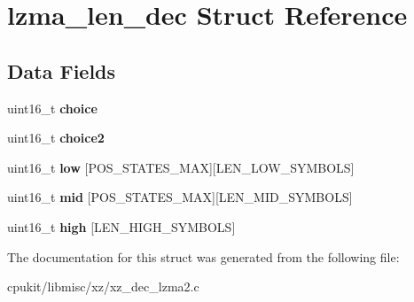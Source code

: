 \hypertarget{structlzma__len__dec}{}\section{lzma\+\_\+len\+\_\+dec Struct Reference}
\label{structlzma__len__dec}
\subsection*{Data Fields}
\begin{DoxyCompactItemize}
\item 
\mbox{\label{structlzma__len__dec_a783feccf1cfaf45ca997d0d4841f206d}} 
uint16\+\_\+t {\bfseries choice}
\item 
\mbox{\label{structlzma__len__dec_a550309c97d2255918fe450355934f0f1}} 
uint16\+\_\+t {\bfseries choice2}
\item 
\mbox{\label{structlzma__len__dec_a34574ecadfc03ed153d248dd2dd4d13c}} 
uint16\+\_\+t {\bfseries low} \mbox{[}P\+O\+S\+\_\+\+S\+T\+A\+T\+E\+S\+\_\+\+M\+AX\mbox{]}\mbox{[}L\+E\+N\+\_\+\+L\+O\+W\+\_\+\+S\+Y\+M\+B\+O\+LS\mbox{]}
\item 
\mbox{\label{structlzma__len__dec_aa83efc9cacdff64e0c13ddc56646b4e4}} 
uint16\+\_\+t {\bfseries mid} \mbox{[}P\+O\+S\+\_\+\+S\+T\+A\+T\+E\+S\+\_\+\+M\+AX\mbox{]}\mbox{[}L\+E\+N\+\_\+\+M\+I\+D\+\_\+\+S\+Y\+M\+B\+O\+LS\mbox{]}
\item 
\mbox{\label{structlzma__len__dec_af7e8d719ac1a9d7b350a6f661dbaf2b3}} 
uint16\+\_\+t {\bfseries high} \mbox{[}L\+E\+N\+\_\+\+H\+I\+G\+H\+\_\+\+S\+Y\+M\+B\+O\+LS\mbox{]}
\end{DoxyCompactItemize}


The documentation for this struct was generated from the following file\+:\begin{DoxyCompactItemize}
\item 
cpukit/libmisc/xz/xz\+\_\+dec\+\_\+lzma2.\+c\end{DoxyCompactItemize}

